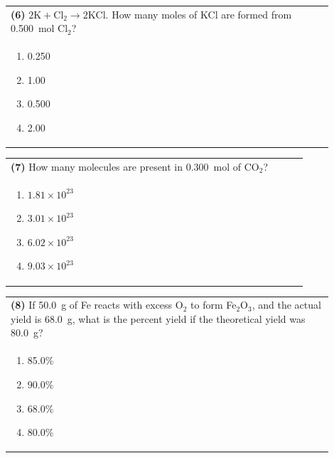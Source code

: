 \documentclass{article}
\begin{document}
\vspace{0.2cm}
\noindent\begin{tabular}{|p{0.9\linewidth}|}
\hline
\textbf{(6)} $2\text{K} + \text{Cl}_2 \rightarrow 2\text{KCl}$. How many moles of KCl are formed from 0.500~mol Cl$_2$?\\[0.2cm]

\begin{minipage}[t]{0.85\linewidth}
\begin{enumerate}[label=\alph*.]
\item 0.250
\item 1.00
\item 0.500
\item 2.00
\end{enumerate}
\end{minipage}\\[0.2cm]
\hline
\end{tabular}

\vspace{0.2cm}
\noindent\begin{tabular}{|p{0.9\linewidth}|}
\hline
\textbf{(7)} How many molecules are present in 0.300~mol of CO$_2$?\\[0.2cm]

\begin{minipage}[t]{0.85\linewidth}
\begin{enumerate}[label=\alph*.]
\item $1.81\times10^{23}$
\item $3.01\times10^{23}$
\item $6.02\times10^{23}$
\item $9.03\times10^{23}$
\end{enumerate}
\end{minipage}\\[0.2cm]
\hline
\end{tabular}

\vspace{0.2cm}
\noindent\begin{tabular}{|p{0.9\linewidth}|}
\hline
\textbf{(8)} If 50.0~g of Fe reacts with excess O$_2$ to form Fe$_2$O$_3$, and the actual yield is 68.0~g, what is the percent yield if the theoretical yield was 80.0~g?\\[0.2cm]

\begin{minipage}[t]{0.85\linewidth}
\begin{enumerate}[label=\alph*.]
\item 85.0\%
\item 90.0\%
\item 68.0\%
\item 80.0\%
\end{enumerate}
\end{minipage}\\[0.2cm]
\hline
\end{tabular}
\end{document}
